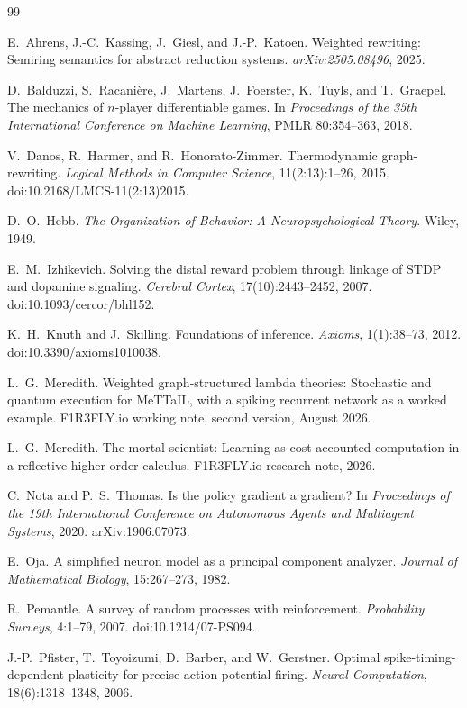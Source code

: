 \documentclass[11pt]{article}
\begin{document}
\begin{thebibliography}{99}

E.~Ahrens, J.-C.~Kassing, J.~Giesl, and J.-P.~Katoen.
Weighted rewriting: Semiring semantics for abstract reduction systems.
\emph{arXiv:2505.08496}, 2025.

D.~Balduzzi, S.~Racani\`ere, J.~Martens, J.~Foerster, K.~Tuyls, and T.~Graepel.
The mechanics of $n$-player differentiable games.
In \emph{Proceedings of the 35th International Conference on Machine
Learning}, PMLR 80:354--363, 2018.

V.~Danos, R.~Harmer, and R.~Honorato-Zimmer.
Thermodynamic graph-rewriting.
\emph{Logical Methods in Computer Science}, 11(2:13):1--26, 2015.
doi:10.2168/LMCS-11(2:13)2015.

D.~O.~Hebb.
\emph{The Organization of Behavior: A Neuropsychological Theory}.
Wiley, 1949.

E.~M.~Izhikevich.
Solving the distal reward problem through linkage of STDP and dopamine
signaling.
\emph{Cerebral Cortex}, 17(10):2443--2452, 2007.
doi:10.1093/cercor/bhl152.

K.~H.~Knuth and J.~Skilling.
Foundations of inference.
\emph{Axioms}, 1(1):38--73, 2012.
doi:10.3390/axioms1010038.

L.~G.~Meredith.
Weighted graph-structured lambda theories: Stochastic and quantum execution
for MeTTaIL, with a spiking recurrent network as a worked example.
F1R3FLY.io working note, second version, August 2026.

L.~G.~Meredith.
The mortal scientist: Learning as cost-accounted computation in a reflective
higher-order calculus.
F1R3FLY.io research note, 2026.

C.~Nota and P.~S.~Thomas.
Is the policy gradient a gradient?
In \emph{Proceedings of the 19th International Conference on Autonomous
Agents and Multiagent Systems}, 2020.  arXiv:1906.07073.

E.~Oja.
A simplified neuron model as a principal component analyzer.
\emph{Journal of Mathematical Biology}, 15:267--273, 1982.

R.~Pemantle.
A survey of random processes with reinforcement.
\emph{Probability Surveys}, 4:1--79, 2007.
doi:10.1214/07-PS094.

J.-P.~Pfister, T.~Toyoizumi, D.~Barber, and W.~Gerstner.
Optimal spike-timing-dependent plasticity for precise action potential firing.
\emph{Neural Computation}, 18(6):1318--1348, 2006.

\end{thebibliography}
\end{document}
